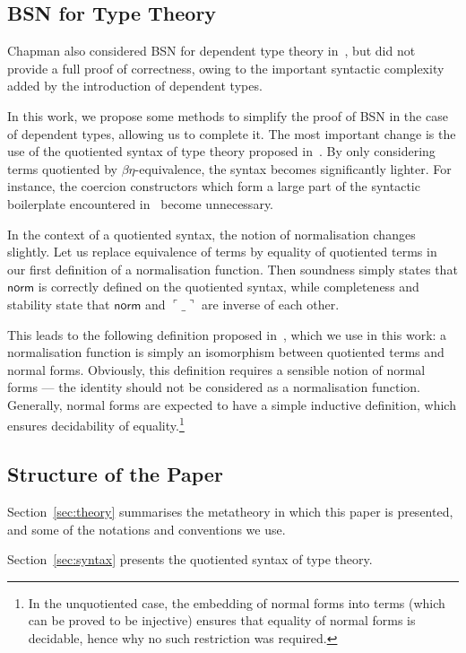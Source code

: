 \documentclass[a4paper,english]{lipics-v2019}
\newcommand{\agdaSymb}[1]{\mathsf{#1}}
\newcommand{\norm}{\agdaSymb{norm}}
\newcommand{\cul}{\ulcorner}
\newcommand{\cur}{\urcorner}
\begin{document}
\subsection{BSN for Type Theory}
Chapman also considered BSN for dependent type theory in~\cite{chapman2009type},
but did not provide a full proof of correctness, owing to the important
syntactic complexity added by the introduction of dependent types.

In this work, we propose some methods to simplify the proof of BSN in the case
of dependent types, allowing us to complete it.
The most important change is the use of the quotiented syntax of type theory
proposed in~\cite{kaposi2016type}. By only considering terms quotiented by
$\beta\eta$-equivalence, the syntax becomes significantly lighter. For instance,
the coercion constructors which form a large part of the syntactic boilerplate
encountered in~\cite{chapman2009type} become unnecessary.

In the context of a quotiented syntax, the notion of normalisation changes
slightly. Let us replace equivalence of terms by equality of quotiented terms
in our first definition of a normalisation function. Then soundness simply
states that $\norm$ is correctly defined on the quotiented syntax, while
completeness and stability state that $\norm$ and $\cul\_\cur$ are inverse of
each other.

This leads to the following definition proposed in~\cite{kaposi2016normalisation},
which we use in this work: a normalisation function is simply an isomorphism
between quotiented terms and normal forms. Obviously, this definition requires
a sensible notion of normal forms --- the identity should not be considered as
a normalisation function. Generally, normal forms are expected to have a simple
inductive definition, which ensures decidability of equality.\footnote{
  In the unquotiented case, the embedding of normal forms into terms (which can
  be proved to be injective) ensures that equality of normal forms is decidable,
  hence why no such restriction was required.
}

\subsection{Structure of the Paper}
Section~\ref{sec:theory} summarises the metatheory in which this paper is
presented, and some of the notations and conventions we use.

Section~\ref{sec:syntax} presents the quotiented syntax of type theory.
\end{document}

